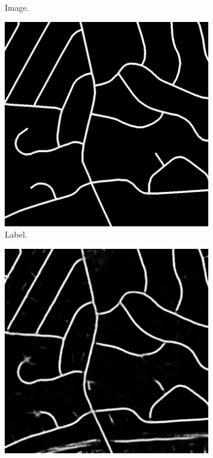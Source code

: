 \begin{figure}[H]
\begin{subfigure}{0.23\textwidth}
\caption{ Image. }
\vspace{0.2cm} %
\end{subfigure}
\hspace*{\fill} %
\begin{subfigure}{0.23\textwidth}
\includegraphics[width=\textwidth]{figs/appendix/label20878930_15.jpg}
\caption{ Label. }
\vspace{0.2cm} %
\end{subfigure}
\hspace*{\fill} %
\begin{subfigure}{0.23\textwidth}
\includegraphics[width=\textwidth]{figs/appendix/pred20878930_15.jpg}

\end{subfigure}
\end{figure}

